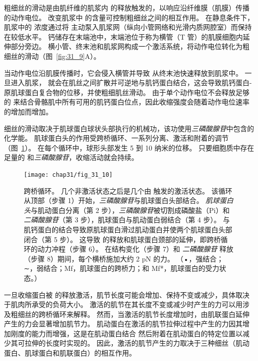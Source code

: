 粗细丝的滑动是由肌纤维的肌浆内  的释放触发的，以响应沿纤维膜（肌膜）传播的动作电位。
改变肌浆中  的含量可控制粗细丝之间的相互作用。
在静息条件下，肌浆中的  浓度通过将  主动泵入肌浆网（纵向小管网络和光滑内质网腔室）而保持在较低水平。
钙储存在末端池中，末端池位于称为横管（T 管）的肌膜细胞内延伸部分旁边。
横小管、终末池和肌浆网构成一个激活系统，将动作电位转化为粗细丝的滑动（图~\ref{fig:31_9}A）。


当动作电位沿肌膜传播时，它会侵入横管并导致  从终末池快速释放到肌浆中。
一旦进入肌浆， 就会在肌丝之间扩散并可逆地与肌钙蛋白结合，这会导致肌钙蛋白-原肌球蛋白复合物的位移，并使粗细肌丝滑动。
由于单个动作电位不会释放足够的  来结合骨骼肌中所有可用的肌钙蛋白位点，因此收缩强度会随着动作电位速率的增加而增加。


细丝的滑动取决于肌球蛋白球状头部执行的机械功，该功使用\textit{三磷酸腺苷}中包含的化学能。
肌球蛋白头的作用受跨桥循环、一系列分离、激活和附着的调节（图~\ref{fig:31_10}）。
在每个循环中，球形头部发生 5 到 10 纳米的位移。
只要细胞质中存在足量的 和\textit{三磷酸腺苷}，收缩活动就会持续。


\begin{figure}[htbp]
	\centering
	\texttt{[image: chap31/fig\_31\_10]}
	\caption{跨桥循环。
	几个非激活状态之后是几个由  触发的激活状态。
	该循环从顶部（步骤 1）开始，\textit{三磷酸腺苷}与肌球蛋白头部结合。
	\textit{肌球蛋白头}与肌动蛋白分离（第 2 步），\textit{三磷酸腺苷}被切割成磷酸盐（Pi）和\textit{二磷酸腺苷}（第 3 步），肌球蛋白与肌动蛋白弱结合（第 4 步）。
	  与肌钙蛋白的结合导致原肌球蛋白滑过肌动蛋白并使两个肌球蛋白头部闭合（第 5 步）。
	这导致  的释放和肌球蛋白颈部的延伸，即跨桥循环的动力冲程（步骤 6）。
	在结构变化（步骤 7）和 \textit{二磷酸腺苷} 释放（步骤 8）期间，每个横桥施加大约 2 pN 的力。 （•，强结合；∼，弱结合；Mf，肌球蛋白的跨桥力；和 Mf*，肌球蛋白的受力状态。）\cite{gordon2001skeletal} }
	\label{fig:31_10}
\end{figure}


一旦收缩蛋白被  的释放激活，肌节长度可能会增加、保持不变或减少，具体取决于肌肉所承受的负荷大小。
激活的肌节在其长度不变或减少时产生的力可以用涉及粗细丝的跨桥循环来解释。
然而，当激活的肌节长度增加时，由肌联蛋白延伸产生的力会显著增加肌节力。
肌动蛋白在激活的肌节拉伸过程中产生的力因其增加刚度的能力而增强，这是在肌动蛋白结合  然后附着在肌动蛋白的特定位置以减少其可拉伸的长度时实现的。
因此，激活的肌节产生的力取决于三种细丝（肌动蛋白、肌球蛋白和肌联蛋白）的相互作用。




